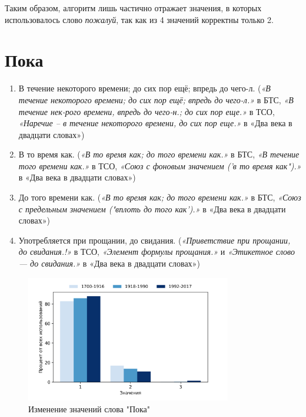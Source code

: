 Таким образом, алгоритм лишь частично отражает значения, в которых использовалось
слово \textit{пожалуй}, так как из 4 значений корректны только 2.

\section*{Пока}

\begin{enumerate}
    \item В течение некоторого времени; до сих пор ещё; впредь до чего-л.
(\textit{«В течение некоторого времени; до сих пор ещё; впредь до чего-л.»} в БТС,
\textit{«В течение нек-рого времени, впредь до чего-н.; до сих пор еще.»} в ТСО,
\textit{«Наречие – в течение некоторого времени, до сих пор еще.»} в «Два века в двадцати словах»)
    \item В то время как.
(\textit{«В то время как; до того времени как.»} в БТС,
\textit{«В течение того времени как.»} в ТСО,
\textit{«Союз с фоновым значением (’в то время как").»} в «Два века в двадцати словах»)
    \item До того времени как.
(\textit{«В то время как; до того времени как.»} в БТС,
\textit{«Союз с предельным значением ("вплоть до того как’).»} в «Два века в двадцати словах»)
    \item Употребляется при прощании, до свидания.
(\textit{«Приветствие при прощании, до свидания.!»} в ТСО,
\textit{«Элемент формулы прощания.»} и \textit{«Этикетное слово — до свидания.»} в «Два века в двадцати словах»)
\end{enumerate}

\begin{figure}[H]
	\centering
	\includegraphics[width=0.8\textwidth]{img/visualizations/poka_minimal}
	\caption{Изменение значений слова "Пока"}
	\label{fig:Пока}
\end{figure}

